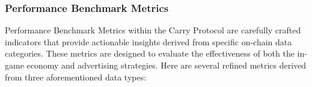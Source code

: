 \subsubsection{Performance Benchmark Metrics}
Performance Benchmark Metrics within the Carry Protocol are carefully crafted indicators that provide actionable insights derived from specific on-chain data categories. These metrics are designed to evaluate the effectiveness of both the in-game economy and advertising strategies. Here are several refined metrics derived from three aforementioned data types:
